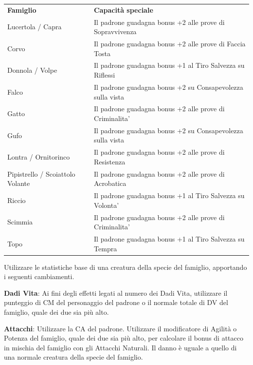 \documentclass[a4paper,11pt,twoside,openany]{book}
\begin{document}
\bigskip

\begin{tabularx}{0.95\textwidth}{lX}
	\toprule
	\textbf{Famiglio}                & \textbf{Capacità speciale}\\
	Lucertola / Capra                & Il padrone guadagna bonus +2 alle prove di Sopravvivenza\\
	Corvo                            & Il padrone guadagna bonus +2 alle prove di Faccia Tosta\\
	Donnola / Volpe                  & Il padrone guadagna bonus +1 al Tiro Salvezza su Riflessi\\
	Falco                            & Il padrone guadagna bonus +2 su Consapevolezza sulla vista\\
	Gatto                            & Il padrone guadagna bonus +2 alle prove di Criminalita'\\
	Gufo                             & Il padrone guadagna bonus +2 su Consapevolezza sulla vista\\
	Lontra / Ornitorinco             & Il padrone guadagna bonus +2 alle prove di Resistenza\\
	Pipistrello / Scoiattolo Volante & Il padrone guadagna bonus +2 alle prove di Acrobatica\\
	Riccio                           & Il padrone guadagna bonus +1 al Tiro Salvezza su Volonta'\\
	Scimmia                          & Il padrone guadagna bonus +2 alle prove di Criminalita'\\
	Topo                             & Il padrone guadagna bonus +1 al Tiro Salvezza su Tempra\\
\end{tabularx}

\bigskip

Utilizzare le statistiche base di una creatura della specie del famiglio, apportando i seguenti cambiamenti.

\bigskip

\textbf{Dadi Vita}: Ai fini degli effetti legati al numero dei Dadi Vita, utilizzare il punteggio di CM del personaggio del padrone o il normale totale di DV del famiglio, quale dei due sia più alto.

\textbf{Attacchi}: Utilizzare la CA del padrone. Utilizzare il modificatore di Agilità o Potenza del famiglio, quale dei due sia più alto, per calcolare il bonus di attacco in mischia del famiglio con gli Attacchi Naturali. Il danno è uguale a quello di una normale creatura della specie del famiglio.
\end{document}
